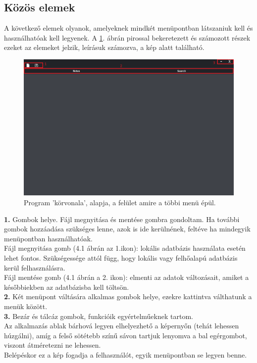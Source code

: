 \subsection{Közös elemek}

A következő elemek olyanok, amelyeknek mindkét menüpontban látszaniuk kell és használhatóak kell legyenek. A \ref{fig:main_foundation}. ábrán pirossal bekeretezett és számozott részek ezeket az elemeket jelzik, leírásuk számozva, a kép alatt található.

\begin{figure}[h]
	\centering
	\includegraphics[scale=0.5]{images/menu_1.png}
	\caption{Program 'körvonala', alapja, a felület amire a többi menü épül.}
	\label{fig:main_foundation}
\end{figure}

\noindent \textbf{1.} Gombok helye. Fájl megnyitása és mentése gombra gondoltam. Ha további gombok hozzáadása szükséges lenne,  azok is ide kerülnének, feltéve ha mindegyik menüpontban használhatóak.
\vspace{5pt} \\Fájl megnyitása gomb (4.1 ábrán az 1.ikon): lokális adatbázis használata esetén lehet fontos. Szükségessége attól függ, hogy lokális vagy felhőalapú adatbázis kerül felhasználásra.
\vspace{5pt} \\Fájl mentése gomb (4.1 ábrán a 2. ikon): elmenti az adatok változásait, amiket a későbbiekben az adatbázisba kell töltsön.
\vspace{5pt} \\ \textbf{2.} Két menüpont váltására alkalmas gombok helye, ezekre kattintva válthatunk a menük között.
\vspace{5pt} \\ \textbf{3.} Bezár és tálcáz gombok, funkcióik egyértelműeknek tartom.
\vspace{10pt} \\Az alkalmazás ablak bárhová legyen elhelyezhető a képernyőn (tehát lehessen húzgálni), amíg a felső sötétebb színű sávon tartjuk lenyomva  a bal egérgombot, viszont átméretezni ne lehessen.
\vspace{5pt} \\Belépéskor ez a kép fogadja a felhasználót, egyik menüpontban se legyen benne. 

